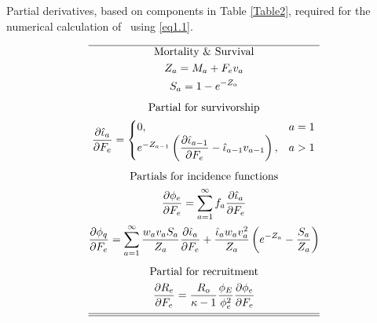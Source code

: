 \begin{multicols}{2}
\begin{tablehere}
  \centering
\caption{Partial derivatives, based on components in Table
\ref{Table2}, required for the numerical calculation of \fmsy\ using \eqref{eq1.1}.}\label{Table3} \tableEq
    \begin{gather}
        \hline
        \mbox{Mortality \& Survival} \nonumber \\
        Z_{a}=M_a+F_ev_a \label{T3.1} \\
        S_{a}=1-e^{-Z_a}\label{T3.2}\\[1ex]
        \mbox{Partial for survivorship} \nonumber \\
        \frac{\partial \hat{\iota}_a}{\partial F_e} =
        \begin{cases}
          0,& a=1 \label{T3.3}\\
          e^{-Z_{a-1}}\left(\dfrac{\partial \hat{\iota}_{a-1}}{\partial F_e}
           -\hat{\iota}_{a-1}v_{a-1}\right),& a>1
        \end{cases} \\[1ex]
        \mbox{Partials for incidence functions} \nonumber \\
        \frac{\partial \phi_e}{\partial F_e}=
            \sum_{a=1}^\infty f_a \frac{\partial \hat{\iota}_a}{\partial
            F_e} \label{T3.4}\\
        \frac{\partial \phi_q}{\partial F_e}=
            \sum_{a=1}^\infty \frac{w_av_a S_a}{Z_a}
             \frac{\partial \hat{\iota}_a}{\partial F_e}
             +\frac{\hat{\iota}_a w_av_a^2}{Z_a}\left(e^{-Z_a}-\frac{S_a}{Z_a} \right) \label{T3.5}\\[1ex]
        \mbox{Partial for recruitment} \nonumber\\
        \frac{\partial R_e}{\partial F_e}=\frac{R_o}{\kappa-1}
        \frac{\phi_E}{\phi_e^2} \frac{\partial \phi_e}{\partial
        F_e} \label{T3.6}\\[1ex]
        \hline \hline \nonumber
    \end{gather}

    \normalEq
\end{tablehere}


\end{multicols}



